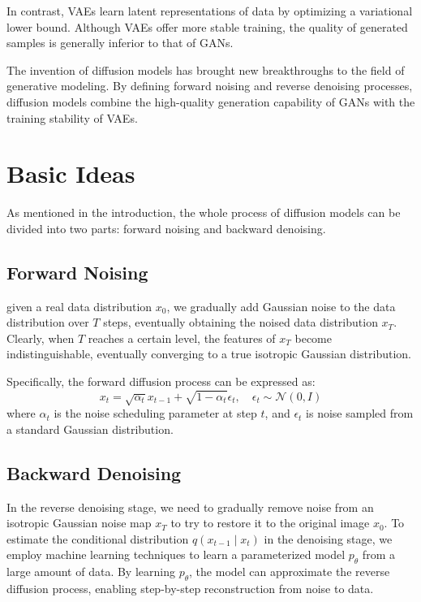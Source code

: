 \documentclass[sigconf,natbib=false]{acmart}
\begin{document}
In contrast, VAEs learn latent representations of data by optimizing a variational lower bound.
Although VAEs offer more stable training,
the quality of generated samples is generally inferior to that of GANs. \cite{goodfellow2014}

The invention of diffusion models has brought new breakthroughs
to the field of generative modeling.
By defining forward noising and reverse denoising processes,
diffusion models combine the high-quality generation capability of GANs
with the training stability of VAEs.

\section{Basic Ideas}
As mentioned in the introduction, the whole process of diffusion models can be divided
into two parts: forward noising and backward denoising. \cite{sohldickstein2015} \cite{ho2020}

\subsection{Forward Noising}
given a real data distribution \( x_0 \),
we gradually add Gaussian noise to the data distribution over \( T \) steps,
eventually obtaining the noised data distribution \( x_T \).
Clearly, when \( T \) reaches a certain level, the features of \( x_T \) become indistinguishable,
eventually converging to a true isotropic Gaussian distribution.

Specifically, the forward diffusion process can be expressed as:
\[
x_t = \sqrt{\alpha_t} x_{t-1} + \sqrt{1 - \alpha_t} \epsilon_t, \quad \epsilon_t \sim \mathcal{N}(0, I)
\]
where \( \alpha_t \) is the noise scheduling parameter at step \( t \),
and \( \epsilon_t \) is noise sampled from a standard Gaussian distribution.

\subsection{Backward Denoising}

In the reverse denoising stage,
we need to gradually remove noise from an isotropic Gaussian noise map \( x_T \)
to try to restore it to the original image \( x_0 \).
To estimate the conditional distribution \( q(x_{t-1} \mid x_t) \) in the denoising stage,
we employ machine learning techniques to learn a parameterized model
\( p_\theta \) from a large amount of data.
By learning \( p_\theta \), the model can approximate the reverse diffusion process,
enabling step-by-step reconstruction from noise to data.
\end{document}
